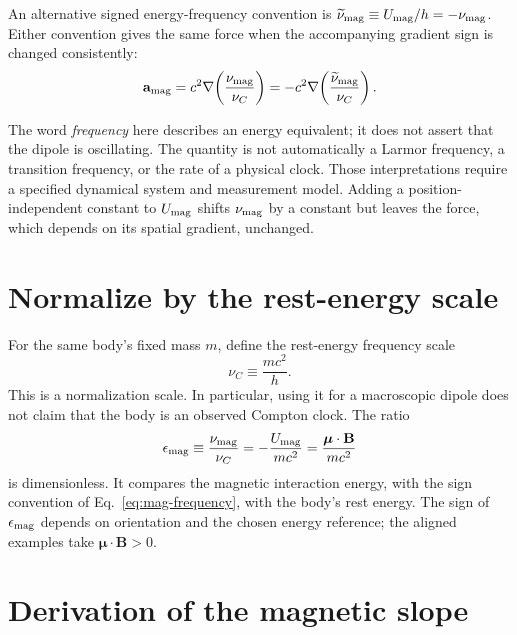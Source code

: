 \documentclass[12pt]{article}
\begin{document}
An alternative signed energy-frequency convention is $\widetilde{\nu}_{\rm mag}\equiv U_{\rm mag}/h=-\nu_{\rm mag}$. Either convention gives the same force when the accompanying gradient sign is changed consistently:
\begin{equation}
  \mathbf a_{\rm mag}
  =c^2\nabla\!\left(\frac{\nu_{\rm mag}}{\nu_C}\right)
  =-c^2\nabla\!\left(\frac{\widetilde{\nu}_{\rm mag}}{\nu_C}\right).
  \label{eq:frequency-sign-conventions}
\end{equation}

The word \emph{frequency} here describes an energy equivalent; it does not assert that the dipole is oscillating. The quantity is not automatically a Larmor frequency, a transition frequency, or the rate of a physical clock. Those interpretations require a specified dynamical system and measurement model. Adding a position-independent constant to $U_{\rm mag}$ shifts $\nu_{\rm mag}$ by a constant but leaves the force, which depends on its spatial gradient, unchanged.

\section{Normalize by the rest-energy scale}
\label{sec:normalization}

For the same body's fixed mass $m$, define the rest-energy frequency scale
\begin{equation}
  \nu_C\equiv\frac{mc^2}{h}.
  \label{eq:rest-frequency}
\end{equation}
This is a normalization scale. In particular, using it for a macroscopic dipole does not claim that the body is an observed Compton clock. The ratio
\begin{equation}
  \epsilon_{\rm mag}
  \equiv\frac{\nu_{\rm mag}}{\nu_C}
  =-\frac{U_{\rm mag}}{mc^2}
  =\frac{\boldsymbol{\mu}\cdot\mathbf B}{mc^2}
  \label{eq:energy-ratio}
\end{equation}
is dimensionless. It compares the magnetic interaction energy, with the sign convention of Eq.~\eqref{eq:mag-frequency}, with the body's rest energy. The sign of $\epsilon_{\rm mag}$ depends on orientation and the chosen energy reference; the aligned examples take $\boldsymbol{\mu}\cdot\mathbf B>0$.

\section{Derivation of the magnetic slope}
\label{sec:derive-slope}
\end{document}
